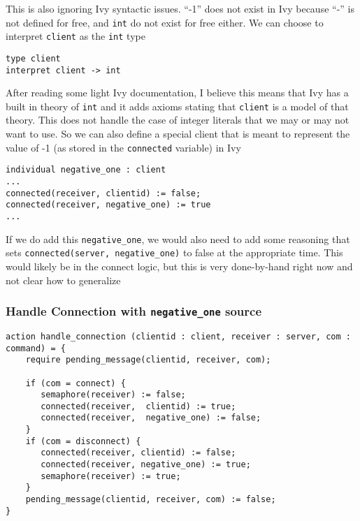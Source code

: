 \documentclass[11pt]{article}
\begin{document}
This is also ignoring Ivy syntactic issues. ``-1'' does not exist in Ivy because ``-'' is not defined for free, and \texttt{int} do not exist for free either. We can choose to interpret \texttt{client} as the \texttt{int} type
\begin{verbatim}
type client
interpret client -> int
\end{verbatim}
After reading some light Ivy documentation, I believe this means that Ivy has a built in theory of \texttt{int} and it adds axioms stating that \texttt{client} is a model of that theory. This does not handle the case of integer literals that we may or may not want to use. So we can also define a special client that is meant to represent the value of -1 (as stored in the \texttt{connected} variable) in Ivy
\begin{verbatim}
individual negative_one : client
...
connected(receiver, clientid) := false;
connected(receiver, negative_one) := true
...
\end{verbatim}

If we do add this \texttt{negative\_one}, we would also need to add some reasoning that sets \texttt{connected(server, negative\_one)} to false at the appropriate time. This would likely be in the connect logic, but this is very done-by-hand right now and not clear how to generalize

\subsubsection{Handle Connection with \texttt{negative\_one} source}
\label{sec:org097ea5b}
\begin{verbatim}
action handle_connection (clientid : client, receiver : server, com : command) = {
    require pending_message(clientid, receiver, com);

    if (com = connect) {
       semaphore(receiver) := false;
       connected(receiver,  clientid) := true;
       connected(receiver,  negative_one) := false;
    }
    if (com = disconnect) {
       connected(receiver, clientid) := false;
       connected(receiver, negative_one) := true;
       semaphore(receiver) := true;
    }
    pending_message(clientid, receiver, com) := false;
}
\end{verbatim}
\end{document}
